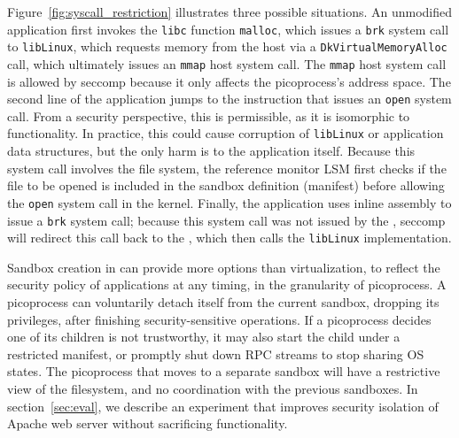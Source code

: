 \vspace{5pt}
Figure~\ref{fig:syscall_restriction} illustrates three possible situations. 
An unmodified application first invokes the {\tt libc} function {\tt malloc}, which issues 
a {\tt brk} system call to {\tt libLinux}, which requests memory 
from the host via a {\tt Dk\-Virtual\-Memory\-Alloc} \pal{} call,
which ultimately issues an {\tt mmap} host system call.
The {\tt mmap} host system call is allowed by seccomp because it only 
affects the picoprocess's address space.
The second line of the application jumps to the \pal{} instruction that issues
an {\tt open} system call.
From a security perspective, this is permissible,
as it is isomorphic to \pal{} functionality.
In practice, this could cause
corruption of {\tt libLinux} or application data structures,
but the only harm is to the application itself. 
Because this system call involves the file system, the reference monitor LSM first checks if the file to be opened is included in the sandbox definition (manifest) before allowing  the {\tt open} system call in the kernel.  
Finally, the application uses inline assembly to issue a {\tt brk} system call;
because this system call was not issued by the \pal{},
seccomp will redirect this call back to the \pal{},
which then calls the {\tt libLinux} implementation.

\vspace{5pt}
Sandbox creation in \sysname{} can provide
more options than virtualization, to reflect the security policy of applications at any timing,
in the granularity of picoprocess. 
A picoprocess can voluntarily detach itself from the current sandbox, dropping its privileges,
after finishing security-sensitive operations.
If a picoprocess decides one of its children is not trustworthy, it may also start the child under a restricted manifest,
or promptly shut down RPC streams to stop sharing OS states.
The picoprocess that moves to a separate sandbox will have a restrictive view of the filesystem, and no coordination with the previous sandboxes.
In section~\ref{sec:eval}, we describe an experiment that improves security isolation of Apache web server without sacrificing functionality.

